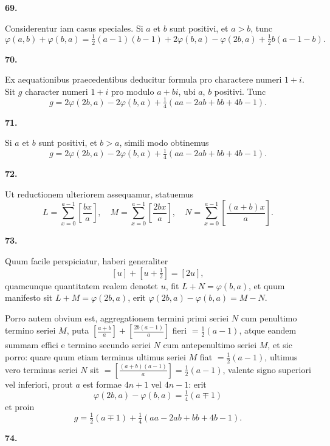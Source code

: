 \documentclass[12pt,a4paper]{article}
\newcommand{\art}[1]{\begin{center}\textbf{#1.}\end{center}}
\begin{document}
\art{69}

Considerentur iam casus speciales. Si $a$ et $b$ sunt positivi, et $a>b$, tunc
\[\varphi(a,b) + \varphi(b,a) = \tfrac{1}{2}(a-1)(b-1) + 2\varphi(b,a) - \varphi(2b,a) + \tfrac{1}{2}b(a-1-b).\]

\art{70}

Ex aequationibus praecedentibus deducitur formula pro charactere numeri $1+i$. Sit $g$ character numeri $1+i$ pro modulo $a+bi$, ubi $a$, $b$ positivi. Tunc
\[g = 2\varphi(2b,a) - 2\varphi(b,a) + \tfrac{1}{4}(aa-2ab+bb+4b-1).\]

\art{71}

Si $a$ et $b$ sunt positivi, et $b>a$, simili modo obtinemus
\[g = 2\varphi(2b,a) - 2\varphi(b,a) + \tfrac{1}{4}(aa-2ab+bb+4b-1).\]

\art{72}

Ut reductionem ulteriorem assequamur, statuemus
\[L = \sum_{x=0}^{a-1} \left[\frac{bx}{a}\right],\quad M = \sum_{x=0}^{a-1} \left[\frac{2bx}{a}\right],\quad N = \sum_{x=0}^{a-1} \left[\frac{(a+b)x}{a}\right].\]

\art{73}

Quum facile perspiciatur, haberi generaliter
\[[u] + [u+\tfrac{1}{2}] = [2u],\]
quamcunque quantitatem realem denotet $u$, fit $L+N=\varphi(b,a)$, et quum manifesto sit $L+M=\varphi(2b,a)$, erit $\varphi(2b,a)-\varphi(b,a)=M-N$.

Porro autem obvium est, aggregationem termini primi seriei $N$ cum penultimo termino seriei $M$, puta $[\frac{a+b}{a}]+[\frac{2b(a-1)}{a}]$ fieri $=\frac{1}{2}(a-1)$, atque eandem summam effici e termino secundo seriei $N$ cum antepenultimo seriei $M$, et sic porro: quare quum etiam terminus ultimus seriei $M$ fiat $=\frac{1}{2}(a-1)$, ultimus vero terminus seriei $N$ sit $=[\frac{(a+b)(a-1)}{a}]=\frac{1}{2}(a-1)$, valente signo superiori vel inferiori, prout $a$ est formae $4n+1$ vel $4n-1$: erit
\[\varphi(2b,a) - \varphi(b,a) = \tfrac{1}{4}(a\mp 1)\]
et proin
\[g = \tfrac{1}{2}(a\mp 1) + \tfrac{1}{4}(aa-2ab+bb+4b-1).\]

\art{74}
\end{document}
